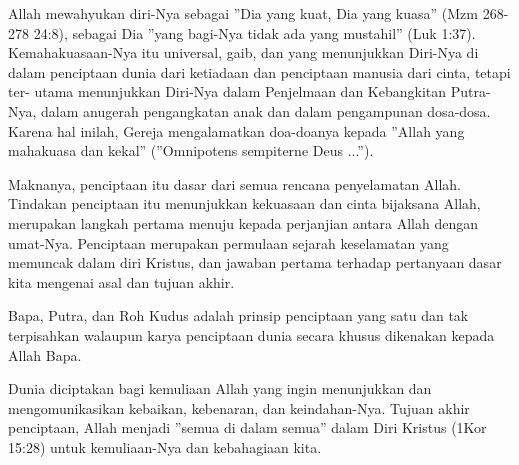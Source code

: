 \newpage
{}
\setcounter{kgkcounter}{49}
\small
{}
      Allah mewahyukan diri-Nya sebagai ”Dia yang kuat, Dia yang kuasa” (Mzm     268-278
24:8), sebagai Dia ”yang bagi-Nya tidak ada yang mustahil” (Luk 1:37). Kemahakuasaan-Nya itu universal, gaib, dan yang menunjukkan Diri-Nya di dalam
penciptaan dunia dari ketiadaan dan penciptaan manusia dari cinta, tetapi ter-
utama menunjukkan Diri-Nya dalam Penjelmaan dan Kebangkitan Putra-Nya,
dalam anugerah pengangkatan anak dan dalam pengampunan dosa-dosa. Karena
hal inilah, Gereja mengalamatkan doa-doanya kepada ”Allah yang mahakuasa dan
kekal” (”Omnipotens sempiterne Deus ...”).

     Maknanya, penciptaan itu dasar dari semua rencana penyelamatan Allah.       
Tindakan penciptaan itu menunjukkan kekuasaan dan cinta bijaksana Allah,        
merupakan langkah pertama menuju kepada perjanjian antara Allah dengan
umat-Nya. Penciptaan merupakan permulaan sejarah keselamatan yang memuncak dalam diri Kristus, dan jawaban pertama terhadap pertanyaan dasar kita mengenai asal dan tujuan akhir.

Bapa, Putra, dan Roh Kudus adalah prinsip penciptaan yang satu dan tak
terpisahkan walaupun karya penciptaan dunia secara khusus dikenakan kepada
          Allah Bapa.

Dunia diciptakan bagi kemuliaan Allah yang ingin menunjukkan dan
mengomunikasikan kebaikan, kebenaran, dan keindahan-Nya. Tujuan akhir penciptaan, Allah menjadi ”semua di dalam semua” dalam Diri Kristus (1Kor 15:28)
          untuk kemuliaan-Nya dan kebahagiaan kita.


\normalsize